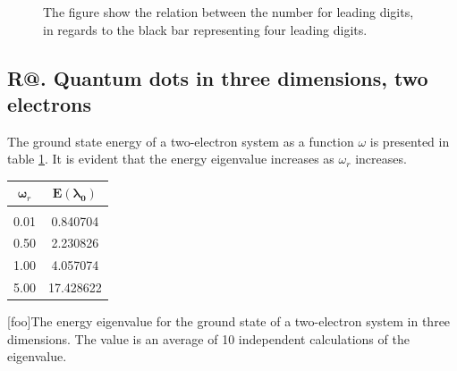 \documentclass[%
reprint,
amsmath,amssymb,
aps,
]{revtex4-1}
\makeatletter
\newcommand*{\rom}[1]{\expandafter\@slowromancap\romannumeral #1@}
\makeatother
\begin{document}
\begin{figure}[!h]
	\noindent{}
	\caption{The figure show the relation between the number for leading digits, in regards to the black bar representing four leading digits.} \label{fig:RE}
\end{figure}
 
\subsection*{R\rom{3}. Quantum dots in three dimensions, two electrons} \noindent 
The ground state energy of a two-electron system as a function $\omega$ is presented in table \ref{tab2}. It is evident that the energy eigenvalue increases as $\omega_r$ increases. 

\begin{table}[H]
	\centering 
	\begin{tabular} {|c|c|}
		\hline
		$\mathbf{\omega}_r$ & $\mathbf{E(\lambda_0)}$\\ 
		\hline
		& \\ 
0.01 &  0.840704 \\
0.50 &  2.230826\\
1.00 &  4.057074\\
5.00 &  17.428622\\ 
\hline 
	\end{tabular}
	[foo]{The energy eigenvalue for the ground state of a two-electron system in three dimensions. The value is an average of 10 independent calculations of the eigenvalue.\label{tab2}}
\end{table}
\end{document}
